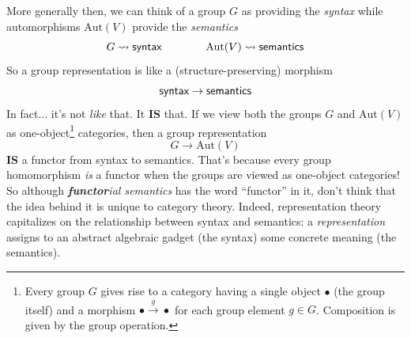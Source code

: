 \documentclass{tufte-handout-tai}
\newcommand{\cat}[1]{{\normalfont\textsf{#1}}}
\theoremstyle{plain}
\theoremstyle{definition}
\theoremstyle{remark}
\begin{document}
More generally then, we can think of a group $G$ as providing the \textit{syntax} while automorphisms $\text{Aut}(V)$ provide the \textit{semantics}
\[G\rightsquigarrow \cat{syntax} \qquad \qquad \text{Aut}(V)\rightsquigarrow \cat{semantics}\]
So a group representation is like a (structure-preserving) morphism
\[\cat{syntax}\to\cat{semantics}\]
In fact... it's not \textit{like} that. It \textbf{IS} that. If we view both the groups $G$ and $\text{Aut}(V)$ as one-object\footnote{Every group $G$ gives rise to a category having a single object $\bullet$ (the group itself) and a morphism $\bullet\overset{g}{\to}\bullet$ for each group element $g\in G$. Composition is given by the group operation.} categories,
then a group representation \[G\to \text{Aut}(V)\] \textbf{IS} a functor from syntax to semantics. That's because every group homomorphism \textit{is} a functor when the groups are viewed as one-object categories! So although \textit{\textbf{functor}ial semantics} has the word ``functor'' in it, don't think that the idea behind it is unique to category theory. Indeed, representation theory capitalizes on the relationship between syntax and semantics: a \textit{representation} assigns to an abstract algebraic gadget (the syntax) some concrete meaning (the semantics).
\end{document}
